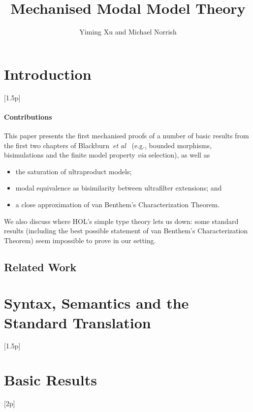 \documentclass{llncs}
\begin{document}
\title{Mechanised Modal Model Theory}

\author{Yiming Xu and Michael Norrish}

\begin{abstract}
\end{abstract}

\maketitle

\section{Introduction}[1.5p]


\paragraph{Contributions}
This paper presents the first mechanised proofs of a number of basic results from the first two chapters of Blackburn~\emph{et al}~\cite{Blackburn} (e.g., bounded morphisms, bisimulations and the finite model property \emph{via} selection), as well as
\begin{itemize}
\item the saturation of ultraproduct models;
\item modal equivalence as bisimilarity between ultrafilter extensions; and
\item a close approximation of van Benthem's Characterization Theorem.
\end{itemize}
We also discuss where HOL's simple type theory lets us down: some standard results (including the best possible statement of van Benthem's Characterization Theorem) seem impossible to prove in our setting.

\subsection{Related Work}

\section{Syntax, Semantics and the Standard Translation}[1.5p]

\section{Basic Results}[2p]
\end{document}
